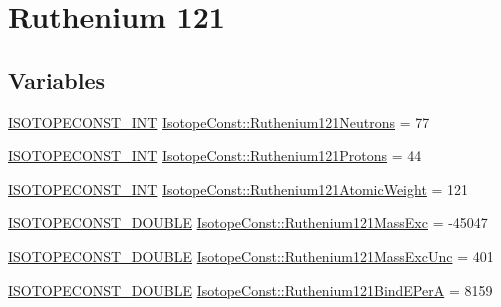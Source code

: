 \hypertarget{group___isotope_const-_ruthenium-_ru121}{}\section{Ruthenium 121}
\label{group___isotope_const-_ruthenium-_ru121}
\subsection*{Variables}
\begin{DoxyCompactItemize}
\item 
\mbox{\hyperlink{group___isotope_const-_macros_ga5f18360b3e99483a35c32d789e62621c}{I\+S\+O\+T\+O\+P\+E\+C\+O\+N\+S\+T\+\_\+\+I\+NT}} \mbox{\hyperlink{group___isotope_const-_ruthenium-_ru121_ga238a9494de30dfa39abcfc976169660e}{Isotope\+Const\+::\+Ruthenium121\+Neutrons}} = 77
\item 
\mbox{\hyperlink{group___isotope_const-_macros_ga5f18360b3e99483a35c32d789e62621c}{I\+S\+O\+T\+O\+P\+E\+C\+O\+N\+S\+T\+\_\+\+I\+NT}} \mbox{\hyperlink{group___isotope_const-_ruthenium-_ru121_ga128107fc4dcfb55a31e6ba2ea33efa5e}{Isotope\+Const\+::\+Ruthenium121\+Protons}} = 44
\item 
\mbox{\hyperlink{group___isotope_const-_macros_ga5f18360b3e99483a35c32d789e62621c}{I\+S\+O\+T\+O\+P\+E\+C\+O\+N\+S\+T\+\_\+\+I\+NT}} \mbox{\hyperlink{group___isotope_const-_ruthenium-_ru121_ga24fc1a66dd3791f2963be7f47b68168f}{Isotope\+Const\+::\+Ruthenium121\+Atomic\+Weight}} = 121
\item 
\mbox{\hyperlink{group___isotope_const-_macros_ga8f45a7272ce02c0b4c65c44636ed719a}{I\+S\+O\+T\+O\+P\+E\+C\+O\+N\+S\+T\+\_\+\+D\+O\+U\+B\+LE}} \mbox{\hyperlink{group___isotope_const-_ruthenium-_ru121_gad0ae1f8f884b9fdc326b58599e350af6}{Isotope\+Const\+::\+Ruthenium121\+Mass\+Exc}} = -\/45047
\item 
\mbox{\hyperlink{group___isotope_const-_macros_ga8f45a7272ce02c0b4c65c44636ed719a}{I\+S\+O\+T\+O\+P\+E\+C\+O\+N\+S\+T\+\_\+\+D\+O\+U\+B\+LE}} \mbox{\hyperlink{group___isotope_const-_ruthenium-_ru121_gab29acd536a6d94531f659cd7b650c68e}{Isotope\+Const\+::\+Ruthenium121\+Mass\+Exc\+Unc}} = 401
\item 
\mbox{\hyperlink{group___isotope_const-_macros_ga8f45a7272ce02c0b4c65c44636ed719a}{I\+S\+O\+T\+O\+P\+E\+C\+O\+N\+S\+T\+\_\+\+D\+O\+U\+B\+LE}} \mbox{\hyperlink{group___isotope_const-_ruthenium-_ru121_ga7838b63794fe4537fb55a93806655b29}{Isotope\+Const\+::\+Ruthenium121\+Bind\+E\+PerA}} = 8159
\item 

\end{DoxyCompactItemize}
